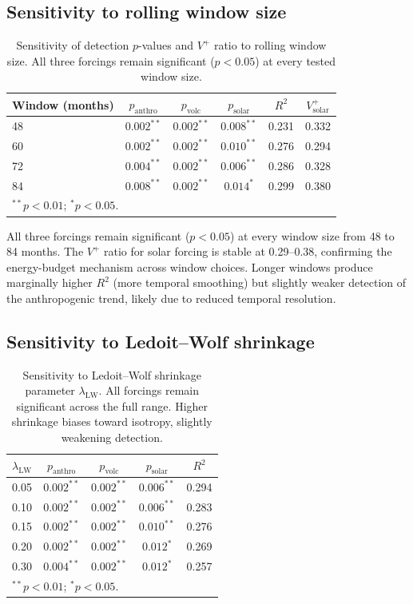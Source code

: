 \documentclass[preprint,12pt]{elsarticle}
\newcommand{\pval}{p}
\begin{document}
\subsection{Sensitivity to rolling window size}\label{app:window}

\begin{table}[h]
\centering
\caption{Sensitivity of detection $p$-values and $V^+$ ratio to rolling window size. All three forcings remain significant ($\pval < 0.05$) at every tested window size.}
\label{tab:B1}
\begin{tabular}{lccccc}
\toprule
Window (months) & $\pval_\mathrm{anthro}$ & $\pval_\mathrm{volc}$ & $\pval_\mathrm{solar}$ & $R^2$ & $V^+_\mathrm{solar}$ \\
\midrule
48 & $0.002^{**}$ & $0.002^{**}$ & $0.008^{**}$ & 0.231 & 0.332 \\
60 & $0.002^{**}$ & $0.002^{**}$ & $0.010^{**}$ & 0.276 & 0.294 \\
72 & $0.004^{**}$ & $0.002^{**}$ & $0.006^{**}$ & 0.286 & 0.328 \\
84 & $0.008^{**}$ & $0.002^{**}$ & $0.014^{*}$ & 0.299 & 0.380 \\
\bottomrule
\multicolumn{6}{l}{\footnotesize $^{**}\pval < 0.01$;\; $^{*}\pval < 0.05$.}
\end{tabular}
\end{table}

All three forcings remain significant ($\pval < 0.05$) at every window size from 48 to 84 months.
The $V^+$ ratio for solar forcing is stable at 0.29--0.38, confirming the energy-budget mechanism across window choices.
Longer windows produce marginally higher $R^2$ (more temporal smoothing) but slightly weaker detection of the anthropogenic trend, likely due to reduced temporal resolution.

\subsection{Sensitivity to Ledoit--Wolf shrinkage}\label{app:shrinkage}

\begin{table}[h]
\centering
\caption{Sensitivity to Ledoit--Wolf shrinkage parameter $\lambda_\mathrm{LW}$. All forcings remain significant across the full range. Higher shrinkage biases toward isotropy, slightly weakening detection.}
\label{tab:B2}
\begin{tabular}{lcccc}
\toprule
$\lambda_\mathrm{LW}$ & $\pval_\mathrm{anthro}$ & $\pval_\mathrm{volc}$ & $\pval_\mathrm{solar}$ & $R^2$ \\
\midrule
0.05 & $0.002^{**}$ & $0.002^{**}$ & $0.006^{**}$ & 0.294 \\
0.10 & $0.002^{**}$ & $0.002^{**}$ & $0.006^{**}$ & 0.283 \\
0.15 & $0.002^{**}$ & $0.002^{**}$ & $0.010^{**}$ & 0.276 \\
0.20 & $0.002^{**}$ & $0.002^{**}$ & $0.012^{*}$ & 0.269 \\
0.30 & $0.004^{**}$ & $0.002^{**}$ & $0.012^{*}$ & 0.257 \\
\bottomrule
\multicolumn{5}{l}{\footnotesize $^{**}\pval < 0.01$;\; $^{*}\pval < 0.05$.}
\end{tabular}
\end{table}
\end{document}
